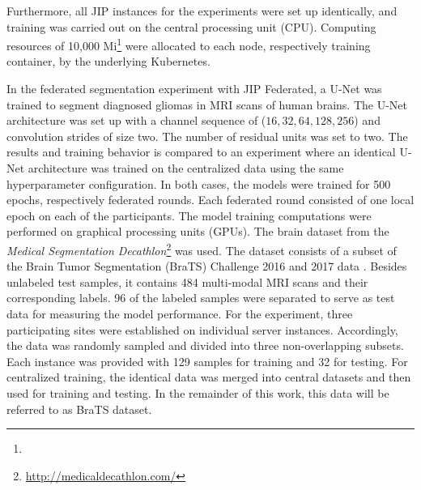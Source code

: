 Furthermore, all JIP instances for the experiments were set up identically, and training was carried out on the central processing unit (CPU). Computing resources of 10,000 Mi\footnote{} were allocated to each node, respectively training container, by the underlying Kubernetes.



In the federated segmentation experiment with JIP Federated, a U-Net \citep{Ronneberger2015U-net:Segmentation} was trained to segment diagnosed gliomas in MRI scans of human brains. The U-Net architecture was set up with a channel sequence of ($16, 32, 64, 128, 256$) and convolution strides of size two. The number of residual units was set to two.
The results and training behavior is compared to an experiment where an identical U-Net architecture was trained on the centralized data using the same hyperparameter configuration.
In both cases, the models were trained for 500 epochs, respectively federated rounds. Each federated round consisted of one local epoch on each of the participants.
The model training computations were performed on graphical processing units (GPUs).
The brain dataset from the \textit{Medical Segmentation Decathlon}\footnote{\url{http://medicaldecathlon.com/}} was used. The dataset consists of a subset of the Brain Tumor Segmentation (BraTS) \citep{Menze2015TheBRATS} Challenge 2016 and 2017 data \citep{Antonelli2021TheDecathlon}. Besides unlabeled test samples, it contains 484 multi-modal MRI scans and their corresponding labels. 96 of the labeled samples were separated to serve as test data for measuring the model performance. For the experiment, three participating sites were established on individual server instances. Accordingly, the data was randomly sampled and divided into three non-overlapping subsets. Each instance was provided with 129 samples for training and 32 for testing. For centralized training, the identical data was merged into central datasets and then used for training and testing.
In the remainder of this work, this data will be referred to as BraTS dataset.

